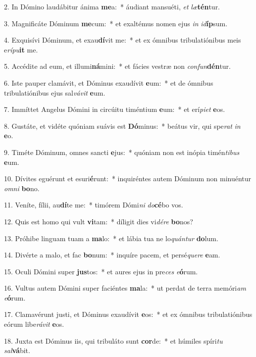 2. In Dómino laudábitur ánima \textbf{me}a:~*  áudiant mansuéti, \textit{et} \textit{læ}\textbf{tén}tur.\

3. Magnificáte Dóminum \textbf{me}cum:~*  et exaltémus nomen ejus \textit{in} \textit{id}\textbf{íp}sum.\

4. Exquisívi Dóminum, et exau\textbf{dí}vit me:~*  et ex ómnibus tribulatiónibus meis e\textit{rí}\textit{pu}\textbf{it} me.\

5. Accédite ad eum, et illumi\textbf{ná}mini:~*  et fácies vestræ non \textit{con}\textit{fun}\textbf{dén}tur.\

6. Iste pauper clamávit, et Dóminus exaudívit \textbf{e}um:~*  et de ómnibus tribulatiónibus ejus sal\textit{vá}\textit{vit} \textbf{e}um.\

7. Immíttet Angelus Dómini in circúitu timéntium \textbf{e}um:~*  et erí\textit{pi}\textit{et} \textbf{e}os.\

8. Gustáte, et vidéte quóniam suávis est \textbf{Dó}minus:~*  beátus vir, qui spe\textit{rat} \textit{in} \textbf{e}o.\

9. Timéte Dóminum, omnes sancti \textbf{e}jus:~*  quóniam non est inópia timén\textit{ti}\textit{bus} \textbf{e}um.\

10. Dívites eguérunt et esuri\textbf{é}runt:~*  inquiréntes autem Dóminum non minuéntur \textit{om}\textit{ni} \textbf{bo}no.\

11. Veníte, fílii, au\textbf{dí}te me:~*  timórem Dómi\textit{ni} \textit{do}\textbf{cé}bo vos.\

12. Quis est homo qui vult \textbf{vi}tam:~*  díligit dies vi\textit{dé}\textit{re} \textbf{bo}nos?\

13. Próhibe linguam tuam a \textbf{ma}lo:~*  et lábia tua ne lo\textit{quán}\textit{tur} \textbf{do}lum.\

14. Divérte a malo, et fac \textbf{bo}num:~*  inquíre pacem, et persé\textit{que}\textit{re} \textbf{e}am.\

15. Oculi Dómini super \textbf{jus}tos:~*  et aures ejus in pre\textit{ces} \textit{e}\textbf{ó}rum.\

16. Vultus autem Dómini super faciéntes \textbf{ma}la:~*  ut perdat de terra memóri\textit{am} \textit{e}\textbf{ó}rum.\

17. Clamavérunt justi, et Dóminus exaudívit \textbf{e}os:~*  et ex ómnibus tribulatiónibus eórum libe\textit{rá}\textit{vit} \textbf{e}os.\

18. Juxta est Dóminus iis, qui tribuláto sunt \textbf{cor}de:~*  et húmiles spíri\textit{tu} \textit{sal}\textbf{vá}bit.\


